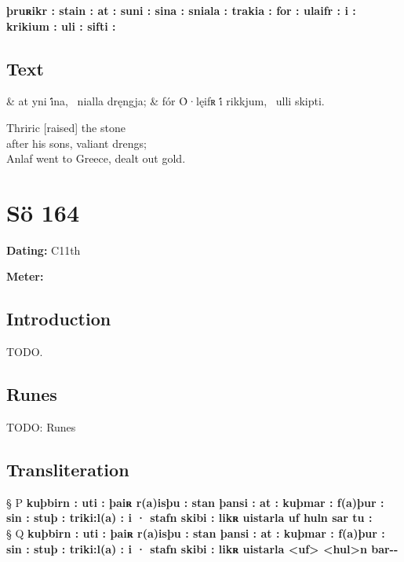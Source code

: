 \textbf{þruʀikr : stain : at : suni : sina : sniala : trakia : for : ulaifr : i : krikium : uli : sifti :}

\subsection{Text}

\bvg\bva[]%
 &
at yni i̇́na, \hld\ nialla dręngja; &
fór Ȯ·lęifʀ i̇́ rikkjum, \hld\ ulli skipti.\eva

\bvb Thriric [raised] the stone \\
after his sons, valiant drengs; \\
Anlaf went to Greece, dealt out gold.\evb\evg

\sectionline\clearpage


\section{Sö 164}

\begin{flushright}%
\textbf{Dating:} C11th

\textbf{Meter:} \Fornyrdislag
\end{flushright}%

\subsection{Introduction}

TODO.

\subsection{Runes}

TODO: Runes%

\subsection{Transliteration}

§ P \textbf{kuþbirn : uti : þaiʀ r(a)isþu : stan þansi : at : kuþmar : f(a)þur : sin : stuþ : triki:l(a) : i · stafn skibi : likʀ uistarla uf huln sar tu :} \\
§ Q \textbf{kuþbirn : uti : þaiʀ r(a)isþu : stan þansi : at : kuþmar : f(a)þur : sin : stuþ : triki:l(a) : i · stafn skibi : likʀ uistarla <uf> <hul>n bar-{}-}


